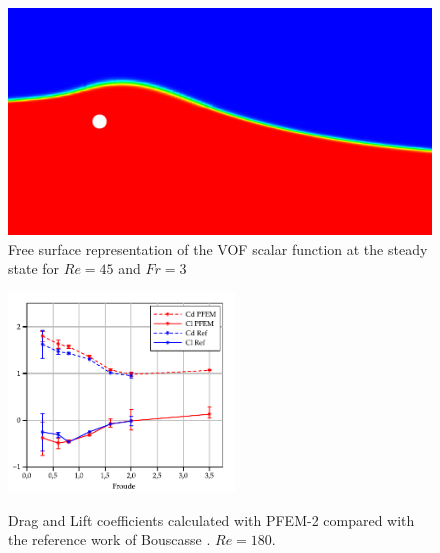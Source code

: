 \documentclass[%
 reprint,
 amsmath,amssymb,
 aps,
prl
]{revtex4-1}
\begin{document}
 \begin{figure}
  \begin{center}
  \includegraphics[width=.9\columnwidth]{vofRe45.png}
  \end{center}
  \caption{Free surface representation of the VOF scalar function at the steady state for $Re=45$ and $Fr=3$}
  \label{f:VOF}
\end{figure}

\begin{figure}
  \begin{center}
  \includegraphics[width=6cm]{CdCl_Re180_hd_0_55.pdf}\\
  \end{center}
  \caption{Drag and Lift coefficients calculated with PFEM-2 compared with the reference work of Bouscasse \cite{Bouscasse15}. $Re=180$.} \label{f:CdCl}
\end{figure}
\end{document}
